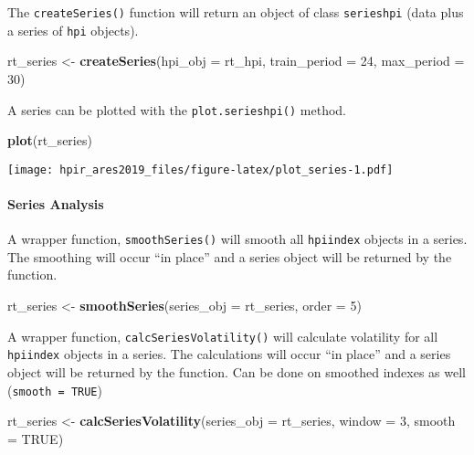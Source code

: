 \documentclass[]{article}
\newenvironment{Shaded}{\begin{snugshade}}{\end{snugshade}}
\newcommand{\KeywordTok}[1]{\textcolor[rgb]{0.13,0.29,0.53}{\textbf{#1}}}
\newcommand{\DataTypeTok}[1]{\textcolor[rgb]{0.13,0.29,0.53}{#1}}
\newcommand{\DecValTok}[1]{\textcolor[rgb]{0.00,0.00,0.81}{#1}}
\newcommand{\StringTok}[1]{\textcolor[rgb]{0.31,0.60,0.02}{#1}}
\newcommand{\OtherTok}[1]{\textcolor[rgb]{0.56,0.35,0.01}{#1}}
\newcommand{\NormalTok}[1]{#1}
\let\oldparagraph\paragraph
\renewcommand{\paragraph}[1]{\oldparagraph{#1}\mbox{}}
\begin{document}
The \texttt{createSeries()} function will return an object of class
\texttt{serieshpi} (data plus a series of \texttt{hpi} objects).

\begin{Shaded}
\begin{Highlighting}[]
\NormalTok{   rt_series <-}\StringTok{ }\KeywordTok{createSeries}\NormalTok{(}\DataTypeTok{hpi_obj =}\NormalTok{ rt_hpi,}
                             \DataTypeTok{train_period =} \DecValTok{24}\NormalTok{,}
                             \DataTypeTok{max_period =} \DecValTok{30}\NormalTok{)}
\end{Highlighting}
\end{Shaded}

A series can be plotted with the \texttt{plot.serieshpi()} method.

\begin{Shaded}
\begin{Highlighting}[]
  \KeywordTok{plot}\NormalTok{(rt_series)}
\end{Highlighting}
\end{Shaded}

\texttt{[image: hpir\_ares2019\_files/figure-latex/plot\_series-1.pdf]}

\paragraph{Series Analysis}\label{series-analysis}

A wrapper function, \texttt{smoothSeries()} will smooth all
\texttt{hpiindex} objects in a series. The smoothing will occur ``in
place'' and a series object will be returned by the function.

\begin{Shaded}
\begin{Highlighting}[]
\NormalTok{  rt_series <-}\StringTok{ }\KeywordTok{smoothSeries}\NormalTok{(}\DataTypeTok{series_obj =}\NormalTok{ rt_series,}
                             \DataTypeTok{order =} \DecValTok{5}\NormalTok{)}
\end{Highlighting}
\end{Shaded}

A wrapper function, \texttt{calcSeriesVolatility()} will calculate
volatility for all \texttt{hpiindex} objects in a series. The
calculations will occur ``in place'' and a series object will be
returned by the function. Can be done on smoothed indexes as well
(\texttt{smooth\ =\ TRUE})

\begin{Shaded}
\begin{Highlighting}[]
\NormalTok{  rt_series <-}\StringTok{ }\KeywordTok{calcSeriesVolatility}\NormalTok{(}\DataTypeTok{series_obj =}\NormalTok{ rt_series,}
                                    \DataTypeTok{window =} \DecValTok{3}\NormalTok{,}
                                    \DataTypeTok{smooth =} \OtherTok{TRUE}\NormalTok{)}
  
\end{Highlighting}
\end{Shaded}
\end{document}
